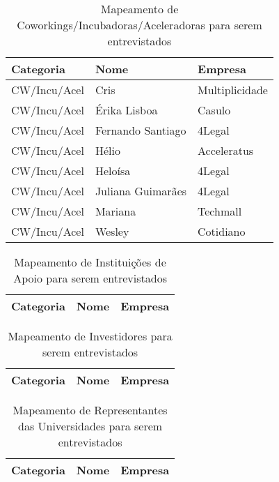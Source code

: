 \begin{table}[!htb]
	\centering
	\label{tabela:sugestao_de_coworkings_para_entrevista}
	\begin{tabular}{ | p{3cm} | p{8cm} | p{4cm} | }
		\hline
		Categoria & Nome & Empresa \\ \hline
		CW/Incu/Acel & Cris & Multiplicidade \\ \hline
		CW/Incu/Acel & Érika Lisboa & Casulo \\ \hline
		CW/Incu/Acel & Fernando Santiago & 4Legal \\ \hline
		CW/Incu/Acel & Hélio & Acceleratus \\ \hline
		CW/Incu/Acel & Heloísa & 4Legal \\ \hline
		CW/Incu/Acel & Juliana Guimarães & 4Legal \\ \hline
		CW/Incu/Acel & Mariana & Techmall \\ \hline
		CW/Incu/Acel & Wesley & Cotidiano \\ \hline
	\end{tabular}
	\caption{Mapeamento de Coworkings/Incubadoras/Aceleradoras para serem entrevistados}
\end{table}

\begin{table}[!htb]
	\centering
	\label{tabela:sugestao_de_instituicoes_para_entrevista}
	\begin{tabular}{ | p{3cm} | p{8cm} | p{4cm} | }
		\hline
		Categoria & Nome & Empresa \\ \hline
		
	\end{tabular}
	\caption{Mapeamento de Instituições de Apoio para serem entrevistados}
\end{table}

\begin{table}[!htb]
	\centering
	\label{tabela:sugestao_de_investidores_para_entrevista}
	\begin{tabular}{ | p{3cm} | p{8cm} | p{4cm} | }
		\hline
		Categoria & Nome & Empresa \\ \hline
		
	\end{tabular}
	\caption{Mapeamento de Investidores para serem entrevistados}
\end{table}

\begin{table}[!htb]
	\centering
	\label{tabela:sugestao_de_universidades_para_entrevista}
	\begin{tabular}{ | p{3cm} | p{8cm} | p{4cm} | }
		\hline
		Categoria & Nome & Empresa \\ \hline
		
	\end{tabular}
	\caption{Mapeamento de Representantes das Universidades para serem entrevistados}
\end{table}

